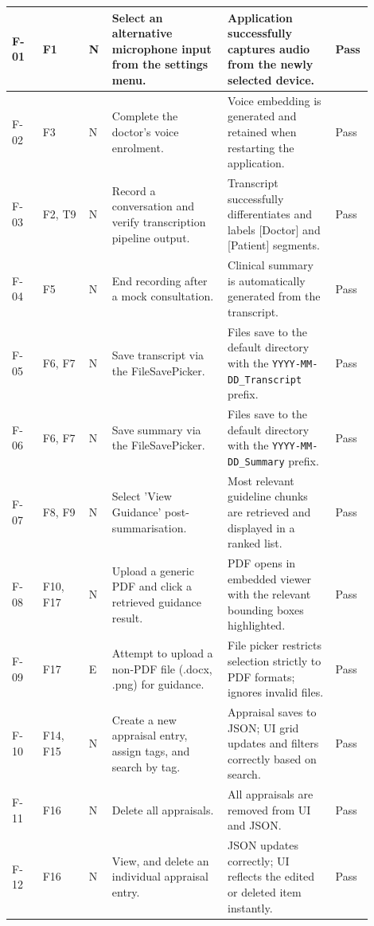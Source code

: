 \begin{longtable}{|p{0.08\linewidth}|p{0.12\linewidth}|p{0.06\linewidth}|p{0.30\linewidth}|p{0.28\linewidth}|p{0.06\linewidth}|}
F-01 & F1 & N & Select an alternative microphone input from the settings menu. & Application successfully captures audio from the newly selected device. & Pass \\ \hline
F-02 & F3 & N & Complete the doctor's voice enrolment. & Voice embedding is generated and retained when restarting the application. & Pass \\ \hline
F-03 & F2, T9 & N & Record a conversation and verify transcription pipeline output. & Transcript successfully differentiates and labels [Doctor] and [Patient] segments. & Pass \\ \hline
F-04 & F5 & N & End recording after a mock consultation. & Clinical summary is automatically generated from the transcript. & Pass \\ \hline
F-05 & F6, F7 & N & Save transcript via the FileSavePicker. & Files save to the default directory with the \texttt{YYYY-MM-DD\_Transcript} prefix. & Pass \\ \hline
F-06 & F6, F7 & N & Save summary via the FileSavePicker. & Files save to the default directory with the \texttt{YYYY-MM-DD\_Summary} prefix. & Pass \\ \hline
F-07 & F8, F9 & N & Select 'View Guidance' post-summarisation. & Most relevant guideline chunks are retrieved and displayed in a ranked list. & Pass \\ \hline
F-08 & F10, F17 & N & Upload a generic PDF and click a retrieved guidance result. & PDF opens in embedded viewer with the relevant bounding boxes highlighted. & Pass \\ \hline
F-09 & F17 & E & Attempt to upload a non-PDF file (.docx, .png) for guidance. & File picker restricts selection strictly to PDF formats; ignores invalid files. & Pass \\ \hline
F-10 & F14, F15 & N & Create a new appraisal entry, assign tags, and search by tag. & Appraisal saves to JSON; UI grid updates and filters correctly based on search. & Pass \\ \hline
F-11 & F16 & N & Delete all appraisals. & All appraisals are removed from UI and JSON. & Pass \\ \hline
F-12 & F16 & N & View, and delete an individual appraisal entry. & JSON updates correctly; UI reflects the edited or deleted item instantly. & Pass \\ \hline


\end{longtable}
